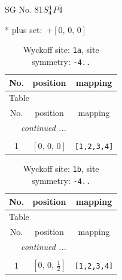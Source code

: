 \documentclass[fleqn,8pt]{jsarticle}
\begin{document}
\setcounter{MaxMatrixCols}{32}

\renewcommand{\tablename}{Table~}
\renewcommand{\figurename}{Figure~}
\begin{center}
\LARGE
SG No. 81\quad$S_{\rm 4}^{1}$\quad$P\bar{4}$\quad[ tetragonal ]
\end{center}
* plus set:\,\,\,$+\left[ 0,\, 0,\, 0 \right]$
\renewcommand{\arraystretch}{1.2}
\begin{longtable}{ccc}
\caption{Wyckoff site: {\tt 1a}, site symmetry: {\tt -4..}}
 \\
 \hline \hline
No. & position & mapping \\ \hline \endfirsthead

\multicolumn{2}{l}{\tablename\ \thetable{}} \\
 \hline \hline
No. & position & mapping \\ \hline \endhead

 \hline \hline
\multicolumn{2}{r}{\footnotesize\it continued ...} \\ \endfoot

 \hline \hline
\multicolumn{2}{r}{} \\ \endlastfoot

1 & $\left[ 0,\, 0,\, 0 \right]$ & {\tt [1,2,3,4]} \\
\end{longtable}
\renewcommand{\arraystretch}{1.2}
\begin{longtable}{ccc}
\caption{Wyckoff site: {\tt 1b}, site symmetry: {\tt -4..}}
 \\
 \hline \hline
No. & position & mapping \\ \hline \endfirsthead

\multicolumn{2}{l}{\tablename\ \thetable{}} \\
 \hline \hline
No. & position & mapping \\ \hline \endhead

 \hline \hline
\multicolumn{2}{r}{\footnotesize\it continued ...} \\ \endfoot

 \hline \hline
\multicolumn{2}{r}{} \\ \endlastfoot

1 & $\left[ 0,\, 0,\, \frac{1}{2} \right]$ & {\tt [1,2,3,4]} \\
\end{longtable}
\renewcommand{\arraystretch}{1.2}
\end{document}
